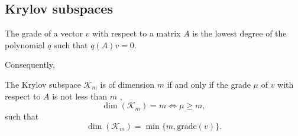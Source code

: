 \subsection{Krylov subspaces}
\begin{definition}
  The grade of a vector $v$ with respect to a matrix $A$ is the lowest degree of the polynomial $q$ such that $q(A)v = 0$.
  \label{def:cg_grade}
\end{definition}
Consequently,
\begin{theorem}
  The Krylov subspace $\mathcal{K}_m$ is of dimension $m$ if and only if the grade $\mu$ of $v$ with respect to $A$ is not less than $m$ \cite[proposition 6.2]{iter_method_saad},
  \begin{equation*}
    \dim(\mathcal{K}_m) = m \iff \mu \geq m,
  \end{equation*}
  such that
  \begin{equation}
    \dim(\mathcal{K}_m) = \min \{m, \textrm{grade}(v)\}.
    \label{eq:cg_krylov_dimension}
  \end{equation}
  \label{th:cg_krylov_dimension}
\end{theorem}

